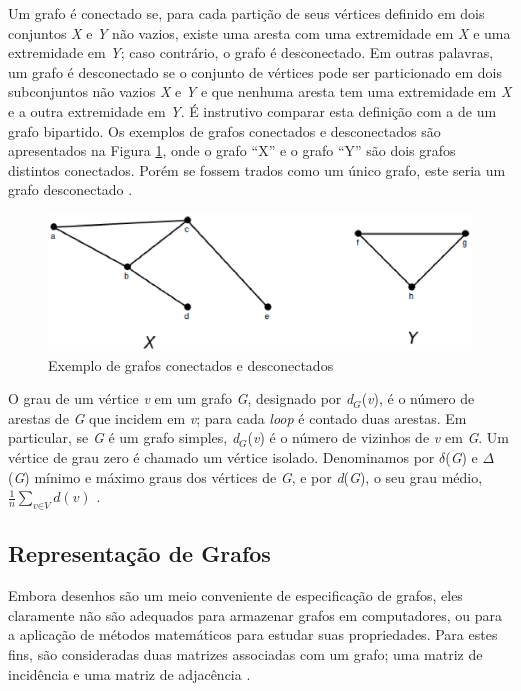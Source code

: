 Um grafo é conectado se, para cada partição de seus vértices definido em dois conjuntos \textit{X} e \textit{Y} não vazios, existe uma aresta com uma extremidade em \textit{X} e uma extremidade em \textit{Y}; caso contrário, o grafo é desconectado. Em outras palavras, um grafo é desconectado se o conjunto de vértices pode ser particionado em dois subconjuntos não vazios \textit{X} e \textit{Y} e que nenhuma aresta tem uma extremidade em \textit{X} e a outra extremidade em \textit{Y}. É instrutivo comparar esta definição com a de um grafo bipartido. Os exemplos de grafos conectados e desconectados são apresentados na Figura \ref{desconectados}, onde o grafo ``X'' e o grafo ``Y'' são dois grafos distintos conectados. Porém se fossem trados como um único grafo, este seria um grafo desconectado \cite{Bondy:2007}.

\begin{figure}[!h]
	\centering
	\includegraphics[scale=0.45]{figuras/capitulo2/desconectados.eps}
	\caption{Exemplo de grafos conectados e desconectados}
	\label{desconectados}
\end{figure}

O grau de um vértice \textit{v} em um grafo \textit{G}, designado por \textit{d$_G$}(\textit{v}), é o número de arestas de \textit{G} que incidem em \textit{v}; para cada \textit{loop} é contado duas arestas. Em particular, se \textit{G} é um grafo simples, \textit{d$_G$}(\textit{v}) é o número de vizinhos de \textit{v} em \textit{G}. Um vértice de grau zero é chamado um vértice isolado. Denominamos por $\delta$(\textit{G}) e $\Delta$(\textit{G}) mínimo e máximo graus dos vértices de \textit{G}, e por \textit{d}(\textit{G}), o seu grau médio, $\frac{1}{n}\sum_{\textit{v}\in\textit{V}} \textit{d}(\textit{v})$ \cite{Diestel:1997}.	

\subsection{Representação de Grafos}

Embora desenhos são um meio conveniente de especificação de grafos, eles claramente não são adequados para armazenar grafos em computadores, ou para a aplicação de métodos matemáticos para estudar suas propriedades. Para estes fins, são consideradas duas matrizes associadas com um grafo; uma matriz de incidência e uma matriz de adjacência \cite{Bondy:2007}.

